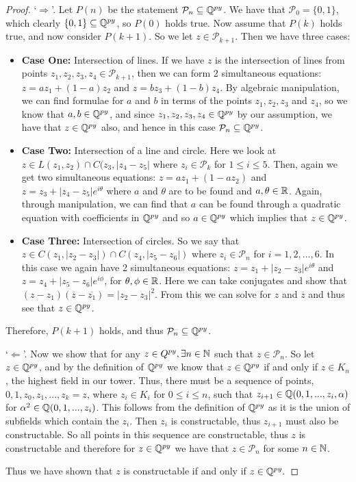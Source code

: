 \begin{proof}
    `$\Longrightarrow$'. Let $P(n)$ be the statement $\mathcal{P}_n \subseteq \mathbb Q^{py}$.
     We have that $\mathcal{P}_0 = \{0,1\}$, which clearly $\{0,1\}\subseteq\mathbb Q^{py}$, so $P(0)$ holds true.
    Now assume that $P(k)$ holds true, and now consider $P(k+1)$. So we let $z \in \mathcal{P}_{k+1}$. Then we have three cases:
    \begin{itemize}
        \item \textbf{Case One:} Intersection of lines. If we have $z$ is the intersection of lines from points $z_1, z_2, z_3, z_4 \in \mathcal{P}_{k+1}$, then we can form 2 simultaneous equations:
        $z = az_1+(1-a)z_2$ and $z = bz_3+(1-b)z_4$. By algebraic manipulation, we can find formulae for $a$ and $b$ in terms of the points $z_1,z_2,z_3$ and $z_4$, so we know that $a,b \in \mathbb Q^{py}$, and since $z_1,z_2,z_3,z_4\in \mathbb Q^{py}$ by our assumption, we have that $z\in \mathbb Q^{py}$ also, and hence in this case $\mathcal{P}_n \subseteq \mathbb Q^{py}$.
        \item \textbf{Case Two:} Intersection of a line and circle. Here we look at $z \in L(z_1,z_2)\cap C(z_3,|z_4-z_5|$ where $z_i \in \mathcal{P}_k$ for $1\leq i \leq 5$. Then, again we get two simultaneous equations:
        $z=az_1+(1-az_2)$ and $z=z_3+|z_4-z_5|e^{i\theta}$ where $a$ and $\theta$ are to be found and $a,\theta \in \mathbb R$. Again, through manipulation, we can find that $a$ can be found through a quadratic equation with coefficients in $\mathbb Q^{py}$ and so $a \in \mathbb Q^{py}$ which implies that $z\in \mathbb Q^{py}$.
        \item \textbf{Case Three:} Intersection of circles. So we say that $z \in C(z_1,|z_2-z_3|) \cap C(z_4,|z_5-z_6|)$ where $z_i \in \mathcal{P}_n$ for $i = 1,2,...,6$. In this case we again have 2 simultaneous equations: $z=z_1+|z_2-z_3|e^{i\theta}$ and $z=z_4+|z_5-z_6|e^{i\phi}$, for $\theta,\phi \in \mathbb R$. Here we can take conjugates and show that $(z-z_1)(\overline{z}-\overline{z_1})=|z_2-z_3|^2$. From this we can solve for $z$ and $\overline{z}$ and thus see that $z \in \mathbb Q^{py}$.
    \end{itemize}
Therefore, $P(k+1)$ holds, and thus $\mathcal{P}_n \subseteq \mathbb Q^{py}$. 

`$\Longleftarrow$'. Now we show that for any $z \in Q^{py}, \exists n \in \mathbb N$ such that $z \in \mathcal{P}_n$.
So let $z \in \mathbb Q^{py}$, and by the definition of $\mathbb Q^{py}$ we know that  $z\in \mathbb Q^{py}$ if and only if $z \in K_n$, the highest field in our tower. Thus, there must be a sequence of points, $0,1,z_0,z_1,...,z_k=z$, where $z_i \in K_i$ for $0\leq i \leq n$, such that $z_{i+1} \in \mathbb Q(0,1,...,z_i,\alpha)$ for $\alpha^2 \in \mathbb Q(0,1,...,z_i)$. This follows from the definition of $\mathbb Q^{py}$ as it is the union of subfields which contain the $z_i$. Then $z_i$ is constructable, thus $z_{i+1}$ must also be constructable. So all points in this sequence are constructable, thus $z$ is constructable and therefore for $z \in \mathbb Q^{py}$ we have that $z \in \mathcal{P}_n$ for some $n \in \mathbb N$.

Thus we have shown that $z$ is constructable if and only if $z\in \mathbb Q^{py}.$
\end{proof}



